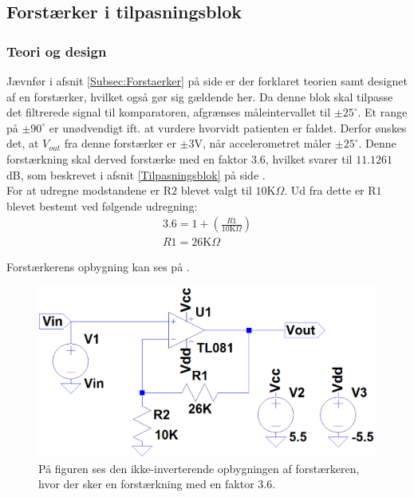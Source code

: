 \subsection{Forstærker i tilpasningsblok}
\subsubsection{Teori og design}
Jævnfør i afsnit \ref{Subsec:Forstaerker} på side \pageref{Subsec:Forstaerker} er der forklaret teorien samt designet af en forstærker, hvilket også gør sig gældende her. Da denne blok skal tilpasse det filtrerede signal til komparatoren, afgrænses måleintervallet til $\pm25^{\circ}$. Et range på $\pm90^{\circ}$ er unødvendigt ift. at vurdere hvorvidt patienten er faldet. Derfor ønskes det, at $V_{out}$ fra denne forstærker er $\pm3$V, når accelerometret måler $\pm25^{\circ}$. Denne forstærkning skal derved forstærke med en faktor $3.6$, hvilket svarer til $11.1261$dB, som beskrevet i afsnit \ref{Tilpasningsblok} på side \pageref{Tilpasningsblok}. \\
For at udregne modstandene er R$2$ blevet valgt til $10$K$\Omega$. Ud fra dette er R$1$ blevet bestemt ved følgende udregning:
\begin{align}
3.6 = 1 + (\frac{R1}{10\text{K}\Omega})\\
R1 = 26\text{K}\Omega
\end{align}

\noindent Forstærkerens opbygning kan ses på .
\begin{figure}[H]
	\centering
	\includegraphics[scale=0.3]{figures/cProblemloesning/Forstaerker_faktor3.PNG}
	\caption{På figuren ses den ikke-inverterende opbygningen af forstærkeren, hvor der sker en forstærkning med en faktor $3.6$.}
	\label{fig:Forstaerker_faktor3}
\end{figure}

